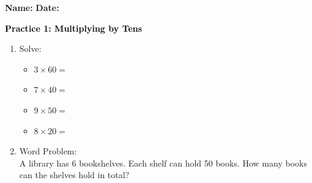 \documentclass[12pt, letterpaper, fleqn]{article}
\newcommand{\blank}{\underline{\hspace{2.2cm}}}
\begin{document}
\textbf{Name:} \underline{\hspace{5cm}}
\hfill
\textbf{Date:} \underline{\hspace{3cm}}\\

\begin{tcolorbox}[colback=customteal!20]
    \large\textcolor{black}{\textbf{Practice 1: Multiplying by Tens}}
\end{tcolorbox}

\vspace{5mm}
\begin{enumerate}[itemsep=2.5cm, leftmargin=0.6cm]
\item Solve:
  \begin{itemize}[itemsep=0.8cm]
    \item $3 \times 60 =$ \blank
    \item $7 \times 40 =$ \blank
    \item $9 \times 50 =$ \blank
    \item $8 \times 20 =$ \blank
  \end{itemize}

\item Word Problem:
\\
A library has 6 bookshelves. Each shelf can hold 50 books. How many books can the shelves hold in total?
\end{enumerate}
\end{document}
